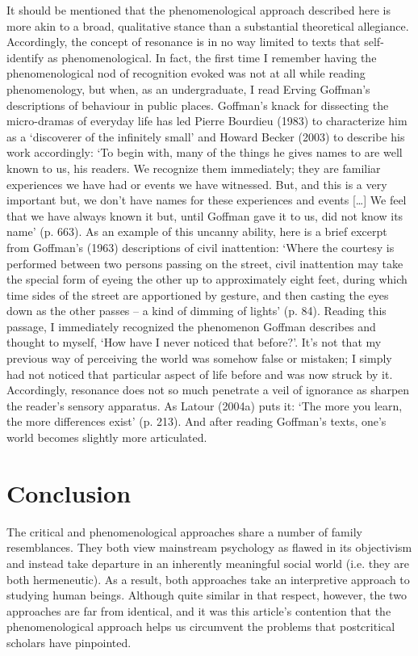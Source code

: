 \begin{adjmulticols}{2}{0mm}{0mm}
It should be mentioned that the phenomenological approach described here is more akin to a broad, qualitative stance than a substantial theoretical allegiance. Accordingly, the concept of resonance is in no way limited to texts that self-identify as phenomenological. In fact, the first time I remember having the phenomenological nod of recognition evoked was not at all while reading phenomenology, but when, as an undergraduate, I read Erving Goffman’s descriptions of behaviour in public places. Goffman’s knack for dissecting the micro-dramas of everyday life has led Pierre Bourdieu (1983) to characterize him as a ‘discoverer of the infinitely small’ and Howard Becker (2003) to describe his work accordingly: ‘To begin with, many of the things he gives names to are well known to us, his readers. We recognize them immediately; they are familiar experiences we have had or events we have witnessed. But, and this is a very important but, we don’t have names for these experiences and events […] We feel that we have always known it but, until Goffman gave it to us, did not know its name’ (p. 663). As an example of this uncanny ability, here is a brief excerpt from Goffman’s (1963) descriptions of civil inattention: ‘Where the courtesy is performed between two persons passing on the street, civil inattention may take the special form of eyeing the other up to approximately eight feet, during which time sides of the street are apportioned by gesture, and then casting the eyes down as the other passes – a kind of dimming of lights’ (p. 84). Reading this passage, I immediately recognized the phenomenon Goffman describes and thought to myself, ‘How have I never noticed that before?’. It’s not that my previous way of perceiving the world was somehow false or mistaken; I simply had not noticed that particular aspect of life before and was now struck by it. Accordingly, resonance does not so much penetrate a veil of ignorance as sharpen the reader’s sensory apparatus. As Latour (2004a) puts it: ‘The more you learn, the more differences exist’ (p. 213). And after reading Goffman’s texts, one’s world becomes slightly more articulated.

\chapter{Conclusion}
The critical and phenomenological approaches share a number of family resemblances. They both view mainstream psychology as flawed in its objectivism and instead take departure in an inherently meaningful social world (i.e. they are both hermeneutic). As a result, both approaches take an interpretive approach to studying human beings. Although quite similar in that respect, however, the two approaches are far from identical, and it was this article’s contention that the phenomenological approach helps us circumvent the problems that postcritical scholars have pinpointed.


\end{adjmulticols}
